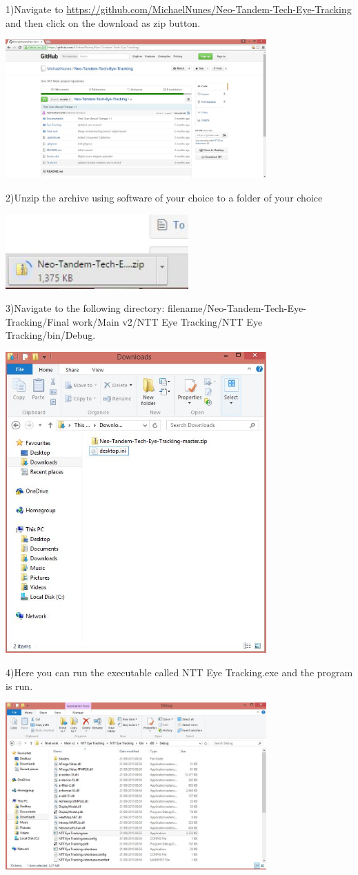 1)Navigate to \href{https://github.com/MichaelNunes/Neo-Tandem-Tech-Eye-Tracking}{https://github.com/MichaelNunes/Neo-Tandem-Tech-Eye-Tracking} and then click on the download as zip button.


		\includegraphics[scale=0.2, width=10cm, keepaspectratio]{./Images/UM1.JPG}

	
2)Unzip the archive using software of your choice to a folder of your choice


		\includegraphics[scale=0.5, width=7cm, keepaspectratio]{./Images/UM2.JPG}


3)Navigate to the following directory: filename/Neo-Tandem-Tech-Eye-Tracking/Final work/Main v2/NTT Eye Tracking/NTT Eye Tracking/bin/Debug.

		\includegraphics[scale=0.5, width=10cm, keepaspectratio]{./Images/UM3.JPG}

	
4)Here you can run the executable called NTT Eye Tracking.exe and the program is run.

		\includegraphics[scale=0.5, width=10cm, keepaspectratio]{./Images/UM4.JPG}
